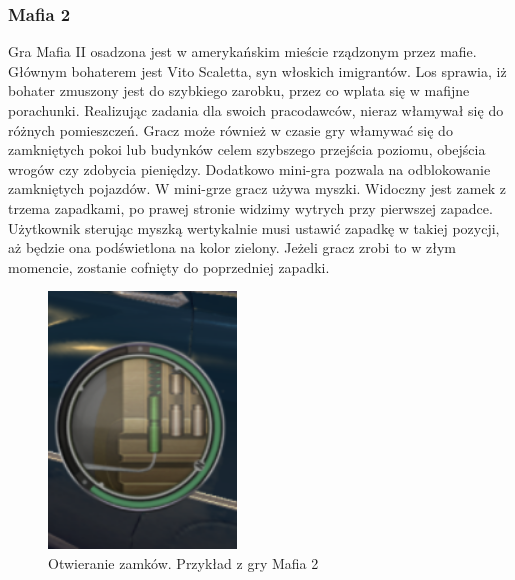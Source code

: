 \documentclass[oneside,polski,logo]{amuthesis}
\begin{document}
\subsubsection{Mafia 2}
Gra Mafia II osadzona jest w amerykańskim mieście rządzonym przez mafie. Głównym bohaterem jest Vito Scaletta, syn włoskich imigrantów. Los sprawia, iż bohater zmuszony jest do szybkiego zarobku, przez co wplata się w mafijne porachunki. Realizując zadania dla swoich pracodawców, nieraz włamywał się do różnych pomieszczeń. Gracz może również w czasie gry włamywać się do zamkniętych pokoi lub budynków celem szybszego przejścia poziomu, obejścia wrogów czy zdobycia pieniędzy. Dodatkowo mini-gra pozwala na odblokowanie zamkniętych pojazdów. W mini-grze gracz używa myszki. Widoczny jest zamek z trzema zapadkami, po prawej stronie widzimy wytrych przy pierwszej zapadce. Użytkownik sterując myszką wertykalnie musi ustawić zapadkę w takiej pozycji, aż będzie ona podświetlona na kolor zielony. Jeżeli gracz zrobi to w złym momencie, zostanie cofnięty do poprzedniej zapadki. \cite{Mafia2}
\begin{figure}[h]
	\centering
	\includegraphics[width=5cm]{images/tyrek/Mafia2.png}
	\caption{Otwieranie zamków. Przykład z gry Mafia 2}
\end{figure}
\end{document}

